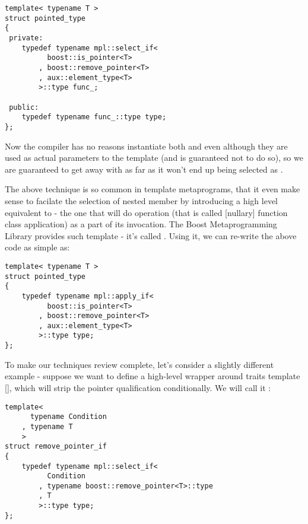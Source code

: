 \documentclass{netobjectdays}
\newcommand{\Mpl}{Boost Meta\-program\-ming Library}
\begin{document}
{\footnotesize
\begin{verbatim}
template< typename T >
struct pointed_type
{
 private:
    typedef typename mpl::select_if<
          boost::is_pointer<T>
        , boost::remove_pointer<T>
        , aux::element_type<T>
        >::type func_;

 public:
    typedef typename func_::type type;
};
\end{verbatim}
}

Now the compiler has no reasons instantiate both 
 and 
 even although they are used as 
actual parameters to the  template (and is 
guaranteed not to do so), so we are guaranteed to get away with 
 as far as it won't end up being 
selected as .

The above technique is so common in template metaprograms, that it
even make sense to facilate the selection of nested  member
by introducing a high level equivalent to  - the one
that will do  operation (that is called [nullary]
function class application) as a part of its invocation.  The \Mpl
provides such template - it's called . Using it, we
can re-write the above code as simple as:

{\footnotesize
\begin{verbatim}
template< typename T >
struct pointed_type
{
    typedef typename mpl::apply_if<
          boost::is_pointer<T>
        , boost::remove_pointer<T>
        , aux::element_type<T>
        >::type type;
};
\end{verbatim}
}

To make our techniques review complete, let's consider a slightly 
different example - suppose we want to define a high-level wrapper 
around  traits template [], which will 
strip the pointer qualification conditionally. We will call it 
:

{\footnotesize
\begin{verbatim}
template<
      typename Condition
    , typename T
    >
struct remove_pointer_if
{
    typedef typename mpl::select_if<
          Condition
        , typename boost::remove_pointer<T>::type
        , T
        >::type type;
};
\end{verbatim}
}
\end{document}

